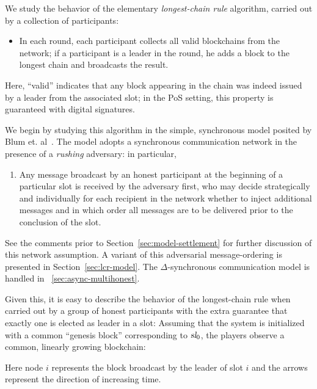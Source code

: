 We study the behavior of the elementary \emph{longest-chain rule}
algorithm, carried out by a collection of participants:
\begin{itemize}
  \item In each round,
each participant collects all valid blockchains from the network; if a
participant is a leader in the round, he adds a block to the longest
chain and broadcasts the result.
\end{itemize}
Here, ``valid'' indicates that any block appearing in the
chain was indeed issued by a leader from the associated slot; in the
PoS setting, this property is guaranteed with digital
signatures.

We begin by studying this algorithm in the simple, synchronous model
posited by Blum et. al~\cite{LinearConsistency}. The model adopts a
synchronous communication network in the presence of a \emph{rushing}
adversary: in particular,
\begin{enumerate}[label={\textbf{A\arabic*}}., ref={\textbf{A\arabic*}}, series=axiom, start = 0]
  \item\label{axiom:message-delivery} 
  Any message broadcast by an honest participant at the beginning of a
  particular slot is received by the adversary first, who may decide
  strategically and individually for each recipient in the network
  whether to inject additional messages and in which order all messages
  are to be delivered prior to the conclusion of the slot. 
\end{enumerate}
See the comments prior to Section~\ref{sec:model-settlement} for
further discussion of this network assumption.  A variant of this
adversarial message-ordering is presented in
Section~\ref{sec:lcr-model}.  The $\Delta$-synchronous communication
model is handled in \Section~\ref{sec:async-multihonest}.


Given this, it is easy to describe the behavior of the longest-chain
rule when carried out by a group of honest participants with the extra
guarantee that exactly one is elected as leader in a slot: Assuming
that the system is initialized with a common ``genesis block''
corresponding to $\textsl{sl}_0$, the players observe a common, linearly
growing blockchain:
\begin{center}
\end{center}
\noindent
Here node $i$ represents the block broadcast by the leader of slot $i$
and the arrows represent the direction of increasing time.

